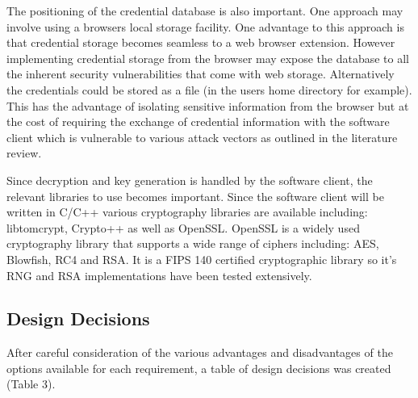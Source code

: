 The positioning of the credential database is also important. One approach may involve using a browsers local storage facility. One advantage to this approach is that credential storage becomes seamless to a web browser extension. However implementing credential storage from the browser may expose the database to all the inherent security vulnerabilities that come with web storage.  Alternatively the credentials could be stored as a file (in the users home directory for example). This has the advantage of isolating sensitive information from the browser but at the cost of requiring the exchange of credential information with the software client which is vulnerable to various attack vectors as outlined in the literature review. 

Since decryption and key generation is handled by the software client, the relevant libraries to use becomes important. Since the software client will be written in C/C++ various cryptography libraries are available including: libtomcrypt, Crypto++ as well as OpenSSL. OpenSSL is a widely used cryptography library that supports a wide range of ciphers including: AES, Blowfish, RC4 and RSA. It is a FIPS 140 certified \cite{fips} cryptographic library so it's RNG and RSA implementations have been tested extensively. 

\subsection{Design Decisions}

After careful consideration of the various advantages and disadvantages of the options available for each requirement, a table of design decisions was created (Table 3).

